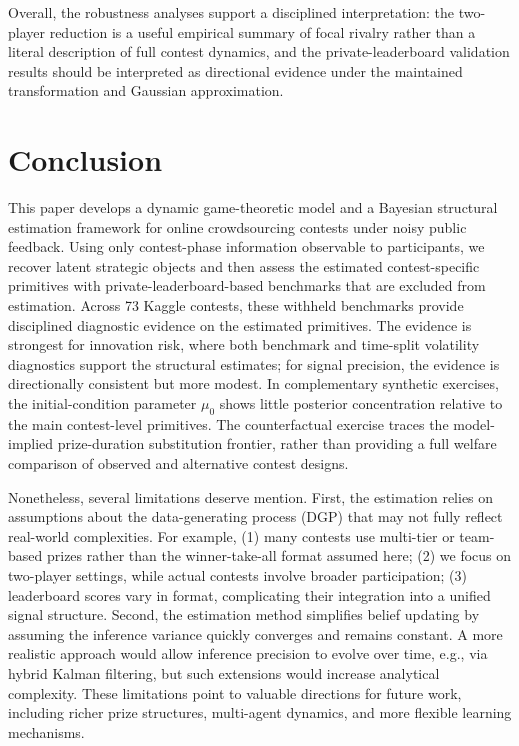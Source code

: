\documentclass[mnsc]{informs3}
\begin{document}
Overall, the robustness analyses support a disciplined interpretation: the two-player reduction is a useful empirical summary of focal rivalry rather than a literal description of full contest dynamics, and the private-leaderboard validation results should be interpreted as directional evidence under the maintained transformation and Gaussian approximation.


\section{Conclusion}

This paper develops a dynamic game-theoretic model and a Bayesian structural estimation framework for online crowdsourcing contests under noisy public feedback.
Using only contest-phase information observable to participants, we recover latent strategic objects and then assess the estimated contest-specific primitives with private-leaderboard-based benchmarks that are excluded from estimation.
Across 73 Kaggle contests, these withheld benchmarks provide disciplined diagnostic evidence on the estimated primitives.
The evidence is strongest for innovation risk, where both benchmark and time-split volatility diagnostics support the structural estimates; for signal precision, the evidence is directionally consistent but more modest.
In complementary synthetic exercises, the initial-condition parameter $\mu_0$ shows little posterior concentration relative to the main contest-level primitives.
The counterfactual exercise traces the model-implied prize-duration substitution frontier, rather than providing a full welfare comparison of observed and alternative contest designs.


Nonetheless, several limitations deserve mention.
First, the estimation relies on assumptions about the data-generating process (DGP) that may not fully reflect real-world complexities.
For example,
(1) many contests use multi-tier or team-based prizes rather than the winner-take-all format assumed here;
(2) we focus on two-player settings, while actual contests involve broader participation;
(3) leaderboard scores vary in format, complicating their integration into a unified signal structure.
Second, the estimation method simplifies belief updating by assuming the inference variance quickly converges and remains constant.
A more realistic approach would allow inference precision to evolve over time, e.g., via hybrid Kalman filtering, but such extensions would increase analytical complexity.
These limitations point to valuable directions for future work, including richer prize structures, multi-agent dynamics, and more flexible learning mechanisms.
\end{document}
